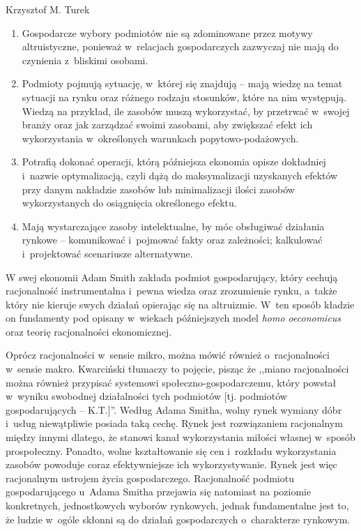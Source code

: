 \begin{artplenv}{Krzysztof M. Turek}
\begin{enumerate}
\item Gospodarcze wybory podmiotów nie są zdominowane przez motywy altruistyczne, ponieważ w~relacjach gospodarczych
zazwyczaj nie mają do czynienia z~bliskimi osobami. 
\item Podmioty pojmują sytuację, w~której się znajdują -- mają wiedzę na temat sytuacji na rynku oraz różnego rodzaju
stosunków, które na nim występują. Wiedzą na przykład, ile zasobów muszą wykorzystać, by przetrwać w~swojej branży oraz
jak zarządzać swoimi zasobami, aby zwiększać efekt ich wykorzystania w~określonych warunkach popytowo-podażowych.
\item Potrafią dokonać operacji, którą późniejsza ekonomia opisze dokładniej i~nazwie optymalizacją, czyli dążą do
maksymalizacji uzyskanych efektów przy danym nakładzie zasobów lub minimalizacji ilości zasobów wykorzystanych do
osiągnięcia określonego efektu.
\item Mają wystarczające zasoby intelektualne, by móc obsługiwać działania rynkowe -- komunikować i~pojmować fakty oraz
zależności; kalkulować i~projektować scenariusze alternatywne.
\end{enumerate}

W swej ekonomii Adam Smith zakłada podmiot gospodarujący, który cechują racjonalność instrumentalna i~pewna wiedza oraz
zrozumienie rynku, a~także który nie kieruje swych działań opierając się na altruizmie. W~ten sposób kładzie on
fundamenty pod opisany w~wiekach późniejszych model \textit{homo oeconomicus} oraz teorię racjonalności ekonomicznej.

Oprócz racjonalności w~sensie mikro, można mówić również o~racjonalności w~sensie makro. Kwarciński
\parencite*[s.~148]{klosinski_racjonalnosc_2009}
tłumaczy to pojęcie, pisząc że ,,miano racjonalności można również przypisać
systemowi społeczno-gospodarczemu, który powstał w~wyniku swobodnej działalności tych podmiotów [tj. podmiotów
gospodarujących -- K.T.]''. Według Adama Smitha, wolny rynek wymiany dóbr i~usług niewątpliwie posiada taką cechę. Rynek
jest rozwiązaniem racjonalnym między innymi dlatego, że stanowi kanał wykorzystania miłości własnej w~sposób
prospołeczny. Ponadto, wolne kształtowanie się cen i~rozkładu wykorzystania zasobów powoduje coraz efektywniejsze ich
wykorzystywanie. Rynek jest więc racjonalnym ustrojem życia gospodarczego. Racjonalność podmiotu
gospodarującego u~Adama Smitha przejawia się natomiast na poziomie konkretnych,
jednostkowych wyborów rynkowych, jednak fundamentalne
jest to, że ludzie w~ogóle skłonni są do działań gospodarczych o~charakterze rynkowym. 


\end{artplenv}
